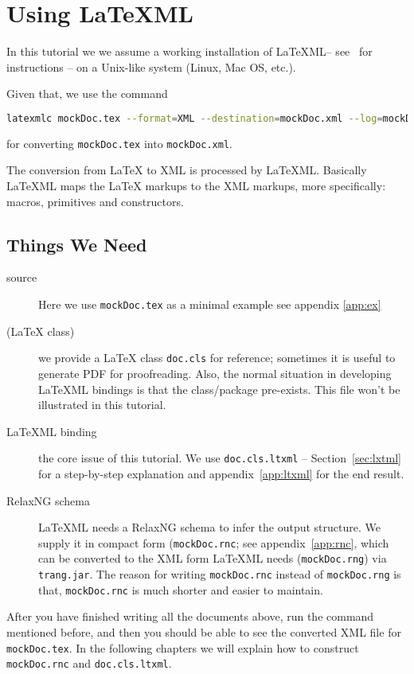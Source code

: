 \documentclass[a4paper]{article}
\def\latexml{{\LaTeX}ML\xspace}
\begin{document}
\section{Using LaTeXML}\label{sec:using}

In this tutorial we we assume a working installation of \latexml -- see~\cite{LaTeXML:get}
for instructions -- on a Unix-like system (Linux, Mac OS, etc.). 

 Given that, we use the
command
\begin{lstlisting}[language=bash]
latexmlc mockDoc.tex --format=XML --destination=mockDoc.xml --log=mockDoc.xml.log
\end{lstlisting}
for converting \lstinline|mockDoc.tex| into \lstinline|mockDoc.xml|.

The conversion from {\LaTeX} to XML is processed by \latexml. Basically \latexml maps the
{\LaTeX} markups to the XML markups, more specifically: macros, primitives and
constructors.

\subsection{Things We Need}
\begin{description}
\item[source] Here we use \lstinline|mockDoc.tex| as a minimal example see appendix \ref{app:ex}
\item[({\LaTeX} class)] we provide a {\LaTeX} class \lstinline|doc.cls| for reference;
  sometimes it is useful to generate PDF for proofreading. Also, the normal situation in
  developing \latexml bindings is that the class/package pre-exists. This file won't be
  illustrated in this tutorial. 
\item[\latexml binding] the core issue of this tutorial. We use \lstinline|doc.cls.ltxml|
  -- Section~\ref{sec:lxtml} for a step-by-step explanation and appendix~\ref{app:ltxml}
  for the end result.
\item[RelaxNG schema] \latexml needs a RelaxNG schema to infer the output structure. We
  supply it in compact form (\lstinline|mockDoc.rnc|; see appendix~\ref{app:rnc}, which
  can be converted to the XML form \latexml needs (\lstinline|mockDoc.rng|) via
  \lstinline|trang.jar|.  The reason for writing \lstinline|mockDoc.rnc| instead of
  \lstinline|mockDoc.rng| is that, \lstinline|mockDoc.rnc| is much shorter and easier to
  maintain. 
\end{description}
After you have finished writing all the documents above, run the command mentioned before,
and then you should be able to see the converted XML file for \lstinline|mockDoc.tex|. In
the following chapters we will explain how to construct \lstinline|mockDoc.rnc| and
\lstinline|doc.cls.ltxml|.
\end{document}
